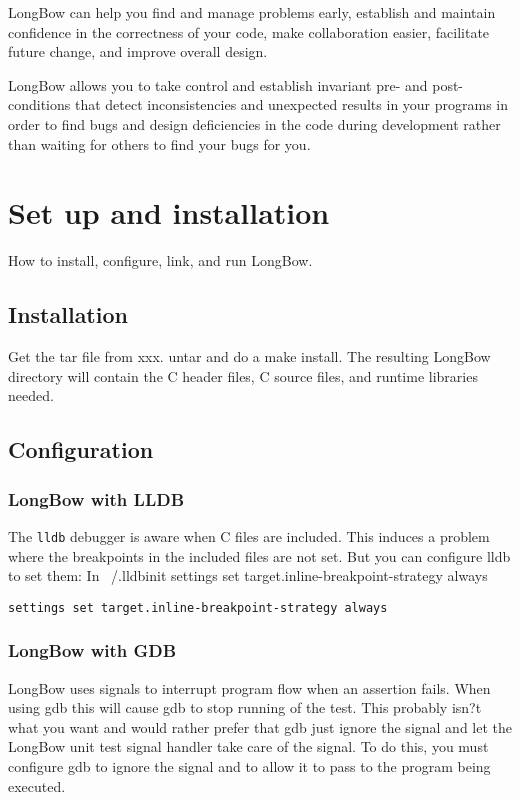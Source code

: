 \documentclass[12pt]{article} %
\begin{document}
LongBow can help you  find and manage problems early, establish and maintain confidence in the correctness of your code, make collaboration easier, facilitate future change, and improve overall design.

LongBow allows you to take control and establish invariant pre- and post-conditions that detect inconsistencies and unexpected results in your programs in order to find bugs and design deficiencies in the code during development rather than waiting for others to find your bugs for you.

\section{Set up and installation} 
How to install, configure, link, and run LongBow.
\subsection {Installation}
Get the tar file from xxx.
untar and do a make install.
The resulting LongBow directory will contain the C header files, C source files, and runtime libraries needed.

\subsection {Configuration}

\subsubsection{LongBow with LLDB}
The {\tt lldb} debugger is aware when C files are included. This induces a problem where the breakpoints in the included files are not set. But you can configure lldb to set them: In ~/.lldbinit settings set target.inline-breakpoint-strategy always

 
\hfill \texttt{settings set target.inline-breakpoint-strategy always}  \hfill \break

\subsubsection{LongBow with GDB}
LongBow uses signals to interrupt program flow when an assertion fails. When using gdb this will cause gdb to stop running of the test. This probably isn?t what you want and would rather prefer that gdb just ignore the signal and let the LongBow unit test signal handler take care of the signal. To do this, you must configure gdb to ignore the signal and to allow it to pass to the program being executed.
\end{document}
